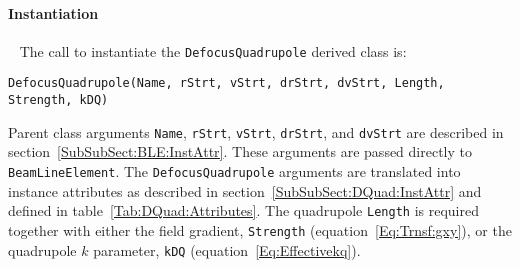 \paragraph{Instantiation} ~\newline
\noindent
The call to instantiate the \texttt{DefocusQuadrupole} derived class is:
\begin{center}
  \texttt{DefocusQuadrupole(Name, rStrt, vStrt, drStrt, dvStrt, Length,
          Strength, kDQ)} 
\end{center}
Parent class arguments \texttt{Name}, \texttt{rStrt}, \texttt{vStrt},
\texttt{drStrt}, and \texttt{dvStrt} are described in
section~\ref{SubSubSect:BLE:InstAttr}.
These arguments are passed directly to \texttt{BeamLineElement}.
The \texttt{DefocusQuadrupole} arguments are translated into instance
attributes as described in section~\ref{SubSubSect:DQuad:InstAttr} and
defined in table~\ref{Tab:DQuad:Attributes}.
The quadrupole \texttt{Length} is required together with
either the field gradient, \texttt{Strength}
(equation~\ref{Eq:Trnsf:gxy}), or the quadrupole $k$
parameter, \texttt{kDQ} (equation~\ref{Eq:Effectivekq}).

